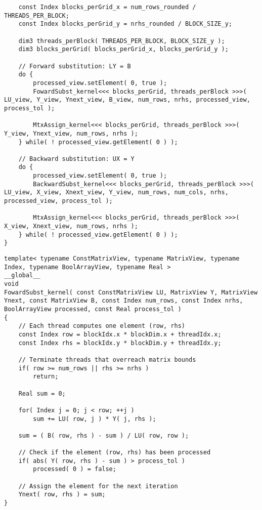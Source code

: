 \begin{lstlisting}
	const Index blocks_perGrid_x = num_rows_rounded / THREADS_PER_BLOCK;
	const Index blocks_perGrid_y = nrhs_rounded / BLOCK_SIZE_y;
	
	dim3 threads_perBlock( THREADS_PER_BLOCK, BLOCK_SIZE_y );
	dim3 blocks_perGrid( blocks_perGrid_x, blocks_perGrid_y );
	
	// Forward substitution: LY = B
	do {
		processed_view.setElement( 0, true );
		FowardSubst_kernel<<< blocks_perGrid, threads_perBlock >>>( LU_view, Y_view, Ynext_view, B_view, num_rows, nrhs, processed_view, process_tol );
		
		MtxAssign_kernel<<< blocks_perGrid, threads_perBlock >>>( Y_view, Ynext_view, num_rows, nrhs );
	} while( ! processed_view.getElement( 0 ) );
	
	// Backward substitution: UX = Y
	do {
		processed_view.setElement( 0, true );
		BackwardSubst_kernel<<< blocks_perGrid, threads_perBlock >>>( LU_view, X_view, Xnext_view, Y_view, num_rows, num_cols, nrhs, processed_view, process_tol );

		MtxAssign_kernel<<< blocks_perGrid, threads_perBlock >>>( X_view, Xnext_view, num_rows, nrhs );
	} while( ! processed_view.getElement( 0 ) );
}
\end{lstlisting}

\begin{lstlisting}[caption={Implementation of the \code{FowardSubst\_kernel()} kernel which computes one forward-substitution iteration.},label={Listing:ISxPP-implementation->kernels->forward-substitution}]
template< typename ConstMatrixView, typename MatrixView, typename Index, typename BoolArrayView, typename Real >
__global__
void
FowardSubst_kernel( const ConstMatrixView LU, MatrixView Y, MatrixView Ynext, const MatrixView B, const Index num_rows, const Index nrhs, BoolArrayView processed, const Real process_tol )
{
	// Each thread computes one element (row, rhs)
	const Index row = blockIdx.x * blockDim.x + threadIdx.x;
	const Index rhs = blockIdx.y * blockDim.y + threadIdx.y;
	
	// Terminate threads that overreach matrix bounds
	if( row >= num_rows || rhs >= nrhs )
		return;
	
	Real sum = 0;
	
	for( Index j = 0; j < row; ++j )
		sum += LU( row, j ) * Y( j, rhs );
	
	sum = ( B( row, rhs ) - sum ) / LU( row, row );
	
	// Check if the element (row, rhs) has been processed
	if( abs( Y( row, rhs ) - sum ) > process_tol )
		processed( 0 ) = false;
	
	// Assign the element for the next iteration
	Ynext( row, rhs ) = sum;
}
\end{lstlisting}

